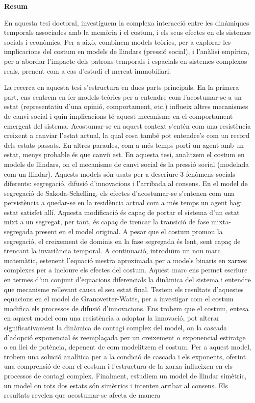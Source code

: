 \pagebreak
\thispagestyle{empty}
\textbf{\huge Resum}

\vspace*{0.5 cm}

En aquesta tesi doctoral, investiguem la complexa interacció entre les dinàmiques temporals associades amb la memòria i el costum, i els seus efectes en els sistemes socials i econòmics. Per a això, combinem models teòrics, per a explorar les implicacions del costum en models de llindars (pressió social), i l'anàlisi empírica, per a abordar l'impacte dels patrons temporals i espacials en sistemes complexos reals, prenent com a cas d'estudi el mercat immobiliari.

La recerca en aquesta tesi s'estructura en dues parts principals. En la primera part, ens centrem en fer models teòrics per a entendre com l'acostumar-se a un estat (representatiu d'una opinió, comportament, etc.) influeix altres mecanismes de canvi social i quin implicacions té aquest mecanisme en el comportament emergent del sistema. Acostumar-se en aquest context s'entén com una resistència creixent a canviar l'estat actual, la qual cosa també pot entendre's com un record dels estats passats. En altres paraules, com a més temps porti un agent amb un estat, menys probable és que canviï est. En aquesta tesi, analitzem el costum en models de llindars, on el mecanisme de canvi social és la pressió social (modelada com un llindar). Aquests models són usats per a descriure 3 fenòmens socials diferents: segregació, difusió d'innovacions i l'arribada al consens. En el model de segregació de Sakoda-Schelling, els efectes d'acostumar-se s'entenen com una persistència a quedar-se en la residència actual com a més temps un agent hagi estat satisfet allí. Aquesta modificació és capaç de portar el sistema d'un estat mixt a un segregat, per tant, és capaç de trencar la transició de fase mixta-segregada present en el model original. A pesar que el costum promou la segregació, el creixement de dominis en la fase segregada és lent, sent capaç de trencant la invariància temporal. A continuació, introduïm un nou marc matemàtic, estenent l'equació mestra aproximada per a models binaris en xarxes complexes per a incloure els efectes del costum. Aquest marc ens permet escriure en termes d'un conjunt d'equacions diferencials la dinàmica del sistema i entendre que mecanisme rellevant causa el seu estat final. Testem els resultats d'aquestes equacions en el model de Granovetter-Watts, per a investigar com el costum modifica els processos de difusió d'innovacions. Ens trobem que el costum, entesa en aquest model com una resistència a adoptar la innovació, pot alterar significativament la dinàmica de contagi complex del model, on la cascada d'adopció exponencial és reemplaçada per un creixement o exponencial estiratge o en llei de potència, depenent de com modelitzem el costum. Per a aquest model, trobem una solució analítica per a la condició de cascada i els exponents, oferint una comprensió de com el costum i l'estructura de la xarxa influeixen en els processos de contagi complex. Finalment, estudiem un model de llindar simètric, un model on tots dos estats són simètrics i intenten arribar al consens. Els resultats revelen que acostumar-se afecta de manera 
